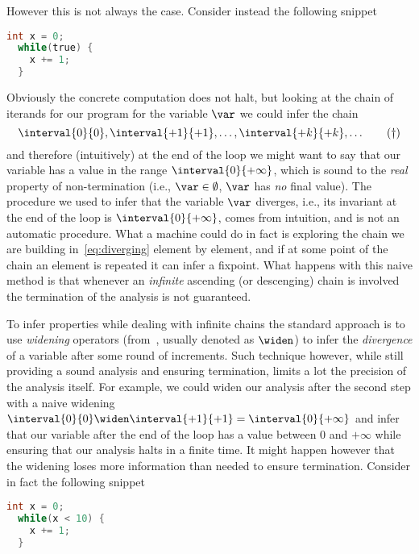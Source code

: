 \noindent
However this is not always the case. Consider instead the following
snippet
\begin{lstlisting}[language=C, caption=Program with a divergent loop, label=exampleloop]
  int x = 0;
  while(true) {
    x += 1;
  }
\end{lstlisting}
Obviously the concrete computation does not halt, but looking at the
chain of iterands for our program for the variable \(\var\) we could
infer the chain
\begin{equation}\label{eq:diverging}
  \interval{0}{0}, \interval{+1}{+1}, \dots, \interval{+k}{+k}, \dots
  \tag{\dag}
\end{equation}
and therefore (intuitively) at the end of the loop we might want to
say that our variable has a value in the range
\(\interval{0}{+\infty}\), which is sound to the \emph{real} property
of non-termination (i.e., \(\var\in\emptyset\), \(\var\) has \emph{no}
final value). The procedure we used to infer that the variable
\(\var\) diverges, i.e., its invariant at the end of the loop is
\(\interval{0}{+\infty}\), comes from intuition, and is not an
automatic procedure. What a machine could do in fact is exploring the
chain we are building in~\eqref{eq:diverging} element by element, and
if at some point of the chain an element is repeated it can infer a
fixpoint.  What happens with this naive method is that whenever an
\emph{infinite} ascending (or descenging) chain is involved the
termination of the analysis is not guaranteed.

To infer properties while dealing with infinite chains the standard
approach is to use \emph{widening} operators
(from~\cite{10.1007/3-540-55844-6_142}, usually denoted as \(\widen\))
to infer the \emph{divergence} of a variable after some round of
increments. Such technique however, while still providing a sound
analysis and ensuring termination, limits a lot the precision of the
analysis itself. For example, we could widen our analysis after the
second step with a naive widening
\(\interval{0}{0} \widen \interval{+1}{+1} = \interval{0}{+\infty}\)
and infer that our variable after the end of the loop has a value
between \(0\) and \(+\infty\) while ensuring that our analysis halts
in a finite time.  It might happen however that the widening loses
more information than needed to ensure termination. Consider in fact
the following snippet

\begin{lstlisting}[language=C, caption=Program with a convergent loop, label=exampleloop]
  int x = 0;
  while(x < 10) {
    x += 1;
  }
\end{lstlisting}


